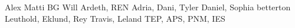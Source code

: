 Alex
Matti
BG
Will
Ardeth, REN
Adria, Dani, Tyler
Daniel, Sophia
betterton
Leuthold, Eklund, Rey
Travis, Leland
TEP, APS, PNM, IES

